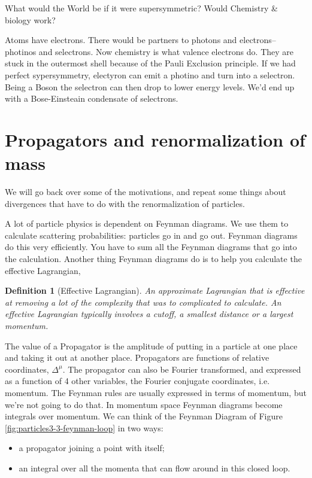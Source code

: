 \documentclass[]{article}
\newtheorem{defn}[thm]{Definition}
\begin{document}
What would the World be if it were supersymmetric? Would Chemistry \& biology work?

Atoms have electrons. There would be partners to photons and electrons--photinos and selectrons. Now chemistry is what valence electrons do. They are stuck in the outermost shell because of the Pauli Exclusion principle. If we had perfect sypersymmetry, electyron can emit a photino and turn into a selectron. Being a Boson the selectron can then drop to lower energy levels. We'd end up with a Bose-Einsteain condensate of selectrons.


\section{Propagators and renormalization of mass}

We will go back over some of the motivations, and repeat some things about divergences that have to do with the renormalization of particles.

A lot of particle physics is dependent on Feynman diagrams. We use them to calculate scattering probabilities: particles go in and go out. Feynman diagrams do this very efficiently. You have to sum all the Feynman diagrams that go into the calculation. Another thing Feynman diagrams do is to help you calculate the effective Lagrangian, 

\begin{defn}[Effective Lagrangian]
	An approximate Lagrangian that is effective at removing a lot of the complexity that was to complicated to calculate. An effective Lagrangian typically involves a cutoff, a smallest distance or a largest momentum.
\end{defn}

The value of a Propagator is the amplitude of putting in a particle at one place and taking it out at another place. Propagators are functions of relative coordinates, $\Delta^\mu$. The propagator can also be Fourier transformed, and expressed as a function of 4 other variables, the Fourier conjugate coordinates, i.e. momentum. The Feynman rules are usually expressed in terms of momentum, but we're not going to do that. In momentum space Feynman diagrams become integrals over momentum. We can think of the Feynman Diagram of Figure \ref{fig:particles3-3-feynman-loop} in two ways:
\begin{itemize}
	\item a propagator joining a point with itself;
	\item an integral over all the momenta that can flow around in this closed loop.
\end{itemize}
\end{document}
